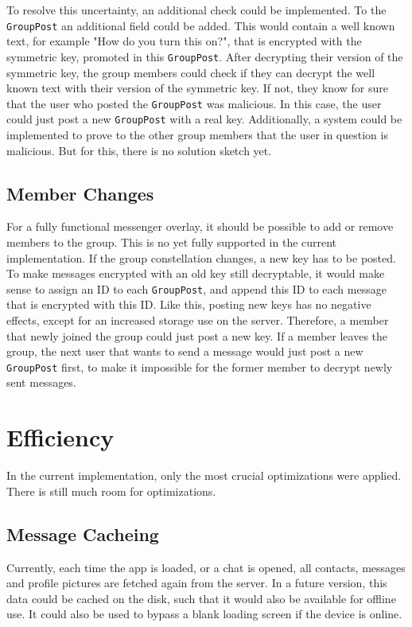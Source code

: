 \documentclass[a4paper, oneside]{discothesis}
\begin{document}
To resolve this uncertainty, an additional check could be implemented. To the \texttt{GroupPost} an additional field could be added. This would contain a well known text, for example "How do you turn this on?", that is encrypted with the symmetric key, promoted in this \texttt{GroupPost}. After decrypting their version of the symmetric key, the group members could check if they can decrypt the well known text with their version of the symmetric key. If not, they know for sure that the user who posted the \texttt{GroupPost} was malicious. In this case, the user could just post a new \texttt{GroupPost} with a real key. Additionally, a system could be implemented to prove to the other group members that the user in question is malicious. But for this, there is no solution sketch yet.

\subsection{Member Changes}
\label{sec:group_member_changes}
For a fully functional messenger overlay, it should be possible to add or remove members to the group. This is no yet fully supported in the current implementation. If the group constellation changes, a new key has to be posted. To make messages encrypted with an old key still decryptable, it would make sense to assign an ID to each \texttt{GroupPost}, and append this ID to each message that is encrypted with this ID. Like this, posting new keys has no negative effects, except for an increased storage use on the server. Therefore, a member that newly joined the group could just post a new key. If a member leaves the group, the next user that wants to send a message would just post a new \texttt{GroupPost} first, to make it impossible for the former member to decrypt newly sent messages.

\section{Efficiency}

In the current implementation, only the most crucial optimizations were applied. There is still much room for optimizations.

\subsection{Message Cacheing}

Currently, each time the app is loaded, or a chat is opened, all contacts, messages and profile pictures are fetched again from the server. In a future version, this data could be cached on the disk, such that it would also be available for offline use. It could also be used to bypass a blank loading screen if the device is online.
\end{document}
